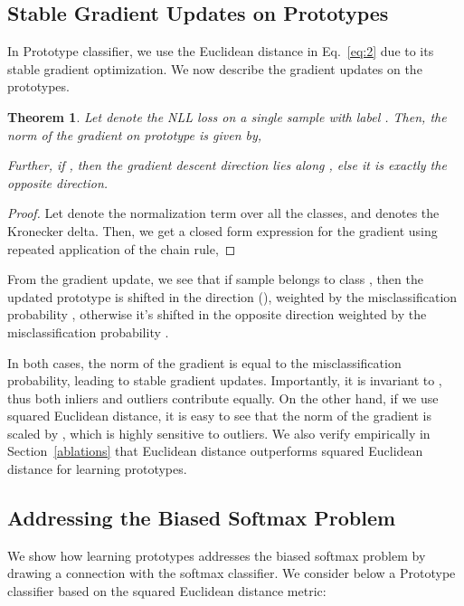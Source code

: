 \documentclass{article}
\newtheorem{theorem}{Theorem}
\begin{document}
\subsection{Stable Gradient Updates on Prototypes}
\label{gradient updates}
In Prototype classifier, we use the Euclidean distance in Eq.~\ref{eq:2} due to its stable gradient optimization. We now describe the gradient updates on the prototypes. 

\begin{theorem}
    Let  denote the NLL loss on a single sample  with label . Then, the  norm of the gradient on prototype  is given by, 
    
Further,  if , then the gradient descent direction lies along , else it is exactly the opposite direction.
\end{theorem}

\begin{proof}
Let  denote the normalization term over all the classes, and  denotes the Kronecker delta. Then, we get a closed form expression for the gradient using repeated application of the chain rule,

\end{proof}

From the gradient update, we see that if sample  belongs to class , then the updated prototype is shifted in the direction (), weighted by the  misclassification probability , otherwise it's shifted in the opposite direction weighted by the misclassification probability . 

In both cases, the  norm of the gradient is equal to the misclassification probability, leading to stable gradient updates. Importantly, it is invariant to , thus both inliers and outliers contribute equally. On the other hand, if we use squared Euclidean distance, it is easy to see that the  norm of the gradient is scaled by , which is highly sensitive to outliers. We also verify empirically in Section~\ref{ablations} that Euclidean distance outperforms squared Euclidean distance for learning prototypes.  

\subsection{Addressing the Biased Softmax Problem}
\label{biased softmax}
We show how learning prototypes addresses the biased softmax problem by drawing a connection with the softmax classifier. We consider below a Prototype classifier based on the squared Euclidean distance metric: 
\end{document}
